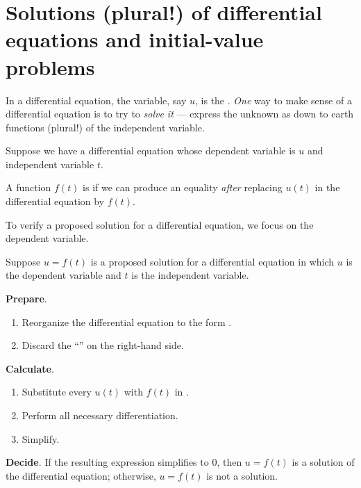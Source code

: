 \documentclass[../main.tex]{subfiles}
\begin{document}
 \section{Solutions (plural!) of differential equations and initial-value problems}

In a differential equation, the  variable, say \(u\), is the . \emph{One} way to make sense of a differential equation is to try to \emph{solve it} --- express the unknown as down to earth functions (plural!) of the independent variable.

\begin{definition}
  Suppose we have a differential equation whose dependent variable is \(u\) and independent variable \(t\). 

  A function \(f(t)\) is  if we can produce an equality \emph{after} replacing \(u(t)\) in the differential equation by \(f(t)\).
\end{definition}

To verify a proposed solution for a differential equation, we focus on the dependent variable. 

\begin{method}
  Suppose \(u = f(t)\) is a proposed solution for a differential equation in which \(u\) is the dependent variable and \(t\) is the independent variable. 

  \textbf{Prepare}.
  \begin{enumerate}[itemsep={0ex}]
    \item Reorganize the differential equation to the form .
    \item Discard the ``'' on the right-hand side. 
  \end{enumerate}

  \textbf{Calculate}.
  \begin{enumerate}[itemsep={0ex}]
    \item Substitute every \(u(t)\) with \(f(t)\) in . 
    \item Perform all necessary differentiation. 
    \item Simplify.
  \end{enumerate} 

  \textbf{Decide}. If the resulting expression simplifies to \(0\), then \(u = f(t)\) is a solution of the differential equation; otherwise, \(u = f(t)\) is not a solution.
\end{method}
\end{document}
